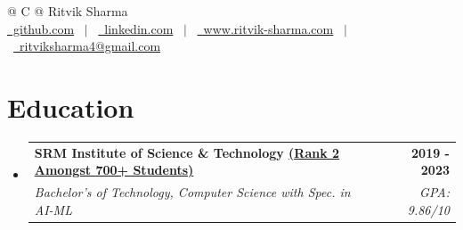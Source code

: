 \documentclass[letterpaper,12pt]{article}
\makeatletter
\newcommand{\resumeSubheading}[4]{
  \vspace{-2pt}\item
    \begin{tabular*}{1.0\textwidth}[t]{l@{\extracolsep{\fill}}r}
      \textbf{#1} & \textbf{\small #2} \\
      \textit{\small#3} & \textit{\small #4}
    \end{tabular*}\vspace{-7pt}
}
\newcommand{\resumeSubHeadingListStart}{\begin{itemize}[leftmargin=0.0in, label={}]}
\newcommand{\resumeSubHeadingListEnd}{\end{itemize}}
\makeatother
\begin{document}
\pagestyle{empty} 


\begin{tabularx}{\linewidth}{@{} C @{}}
\vspace{-25pt}
\Huge{Ritvik Sharma} \\[7pt]
\vspace{-20pt}
\href{https://github.com/ritviksharma4}{\raisebox{-0.03\height}\faGithub\ github.com} \ $|$ \ 
\href{https://linkedin.com/in/ritviksharma4}{\raisebox{-0.03\height}\faLinkedin\ linkedin.com} \ $|$ \ 
\href{https://ritvik-sharma.com}{\raisebox{-0.03\height}\faGlobe \ www.ritvik-sharma.com} \ $|$ \ 
\href{mailto:ritviksharma4@gmail.com}{\raisebox{-0.03\height}\faEnvelope \ ritviksharma4@gmail.com} \\ 
\end{tabularx}

\vspace{-16pt}
\section{Education}
  \resumeSubHeadingListStart
    \resumeSubheading
      {SRM Institute of Science \& Technology \href{https://github.com/ritviksharma4/My-Certificates/blob/main/My\%20Certificates/Ritvik_SRM_Rank_2_Certificate.pdf}{(Rank 2 Amongst 700+ Students)}}{2019 - 2023}
      {Bachelor's of Technology, Computer Science with Spec. in AI-ML}{GPA: 9.86/10}
    \vspace{-5pt}
  \resumeSubHeadingListEnd
\end{document}
